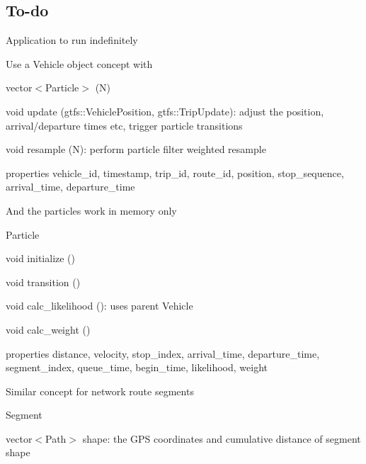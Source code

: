 \subsection*{To-\/do}


\begin{DoxyItemize}
\item Application to run indefinitely
\item Use a {\ttfamily Vehicle} object concept with
\begin{DoxyItemize}
\item {\ttfamily vector$<$Particle$>$ (N)}
\item {\ttfamily void update (gtfs\+::\+Vehicle\+Position, gtfs\+::\+Trip\+Update)}\+: adjust the position, arrival/departure times etc, trigger particle transitions
\item {\ttfamily void resample (N)}\+: perform particle filter weighted resample
\item properties {\ttfamily vehicle\+\_\+id}, {\ttfamily timestamp}, {\ttfamily trip\+\_\+id}, {\ttfamily route\+\_\+id}, {\ttfamily position}, {\ttfamily stop\+\_\+sequence}, {\ttfamily arrival\+\_\+time}, {\ttfamily departure\+\_\+time}
\end{DoxyItemize}
\item And the particles work in memory only
\begin{DoxyItemize}
\item {\ttfamily Particle}
\begin{DoxyItemize}
\item {\ttfamily void initialize ()}
\item {\ttfamily void transition ()}
\item {\ttfamily void calc\+\_\+likelihood ()}\+: uses parent Vehicle
\item {\ttfamily void calc\+\_\+weight ()}
\item properties {\ttfamily distance}, {\ttfamily velocity}, {\ttfamily stop\+\_\+index}, {\ttfamily arrival\+\_\+time}, {\ttfamily departure\+\_\+time}, {\ttfamily segment\+\_\+index}, {\ttfamily queue\+\_\+time}, {\ttfamily begin\+\_\+time}, {\ttfamily likelihood}, {\ttfamily weight}
\end{DoxyItemize}
\end{DoxyItemize}
\item Similar concept for network route segments
\begin{DoxyItemize}
\item {\ttfamily Segment}
\begin{DoxyItemize}
\item {\ttfamily vector$<$Path$>$ shape}\+: the G\+PS coordinates and cumulative distance of segment shape

\end{DoxyItemize}
\end{DoxyItemize}
\end{DoxyItemize}

